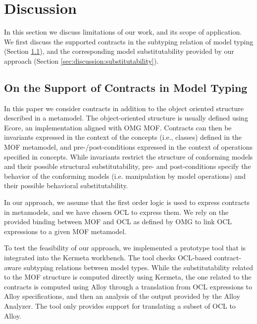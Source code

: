 \section{Discussion}\label{discussion}

In this section we discuss limitations of our work, and its scope of application. 
We first discuss the supported contracts in the subtyping relation of model typing (Section \ref{sec:discussion:oclcontracts}), and the corresponding model substitutability provided by our approach (Section \ref{sec:discussion:substitutability}).

\subsection{On the Support of Contracts in Model Typing}
\label{sec:discussion:oclcontracts}


In this paper we consider contracts in addition to the object oriented structure described in a metamodel. The object-oriented structure is usually defined using Ecore, an implementation aligned with OMG MOF. Contracts can then be invariants expressed in the context of the concepts (i.e., classes) defined in the MOF metamodel, and pre-/post-conditions expressed in the context of operations specified in concepts. While invariants restrict the structure of conforming models and their possible structural substitutability, pre- and post-conditions specify the behavior of the conforming models (i.e. manipulation by model operations) and their possible behavioral substitutability.

In our approach, we assume that the first order logic is used to express contracts in metamodels, and we have chosen OCL to express them. We rely on the provided binding between MOF and OCL as defined by OMG to link OCL expressions to a given MOF metamodel.

To test the feasibility of our approach, we implemented a prototype tool that is integrated into the Kermeta workbench. The tool checks OCL-based contract-aware subtyping relations between model types. While the substitutability related to the MOF structure is computed directly using Kermeta, the one related to the contracts is computed using Alloy through a translation from OCL expressions to Alloy specifications, and then an analysis of the output provided by the Alloy Analyzer. The tool only provides support for translating a subset of OCL to Alloy.

